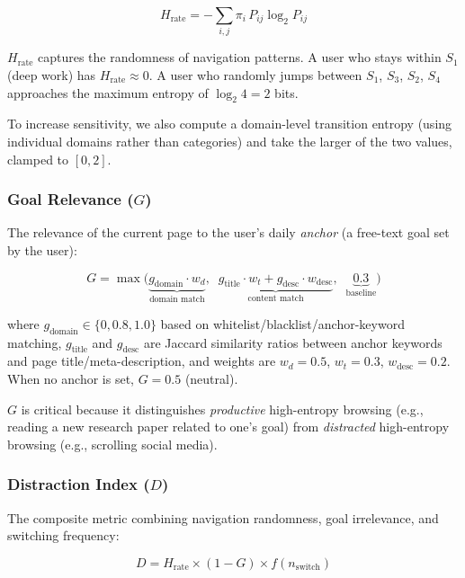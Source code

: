 \documentclass[10pt,letterpaper]{article}
\begin{document}
\begin{equation}
H_{\text{rate}} = -\sum_{i,j} \pi_i \, P_{ij} \log_2 P_{ij}
\end{equation}

$H_{\text{rate}}$ captures the randomness of navigation patterns. A user who stays within $S_1$ (deep work) has $H_{\text{rate}} \approx 0$. A user who randomly jumps between $S_1$, $S_3$, $S_2$, $S_4$ approaches the maximum entropy of $\log_2 4 = 2$ bits.

To increase sensitivity, we also compute a domain-level transition entropy (using individual domains rather than categories) and take the larger of the two values, clamped to $[0, 2]$.

\subsubsection{Goal Relevance ($G$)}

The relevance of the current page to the user's daily \emph{anchor} (a free-text goal set by the user):

\begin{equation}
G = \max\!\Big(\underbrace{g_{\text{domain}} \cdot w_d}_{\text{domain match}},\;\; \underbrace{g_{\text{title}} \cdot w_t + g_{\text{desc}} \cdot w_{\text{desc}}}_{\text{content match}},\;\; \underbrace{0.3}_{\text{baseline}}\Big)
\end{equation}

where $g_{\text{domain}} \in \{0, 0.8, 1.0\}$ based on whitelist/blacklist/anchor-keyword matching, $g_{\text{title}}$ and $g_{\text{desc}}$ are Jaccard similarity ratios between anchor keywords and page title/meta-description, and weights are $w_d = 0.5$, $w_t = 0.3$, $w_{\text{desc}} = 0.2$. When no anchor is set, $G = 0.5$ (neutral).

$G$ is critical because it distinguishes \emph{productive} high-entropy browsing (e.g., reading a new research paper related to one's goal) from \emph{distracted} high-entropy browsing (e.g., scrolling social media).

\subsubsection{Distraction Index ($D$)}

The composite metric combining navigation randomness, goal irrelevance, and switching frequency:

\begin{equation}
D = H_{\text{rate}} \times (1 - G) \times f(n_{\text{switch}})
\label{eq:D}
\end{equation}
\end{document}
